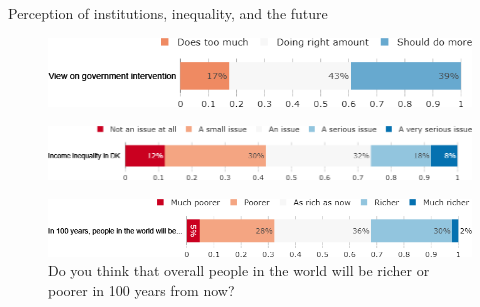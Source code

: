 \documentclass[aspectratio=169,9pt,dvipsnames]{beamer}
\begin{document}
\begin{frame}{Perception of institutions, inequality, and the future}%
\vspace{-.2cm}
\begin{figure}[h!]
\caption{Some people think the government is trying to do too many things that should be left to individuals and businesses. Others think that government should do more to solve our country's problems.
Which come closer to your own view? }
\includegraphics[width=.7\textwidth]{../figures/DK/view_govt_DK.png} \\
\vspace{.1cm}
\caption{How big of an issue do you think income inequality is in Denmark?}
\includegraphics[width=.7\textwidth]{../figures/DK/problem_inequality_DK.png}\\
\vspace{.1cm}
\caption{Do you think that overall people in the world will be richer or poorer in 100 years from now?}
\includegraphics[width=.7\textwidth]{../figures/DK/future_richness_DK.png}
\end{figure}
\end{frame}
\end{document}
